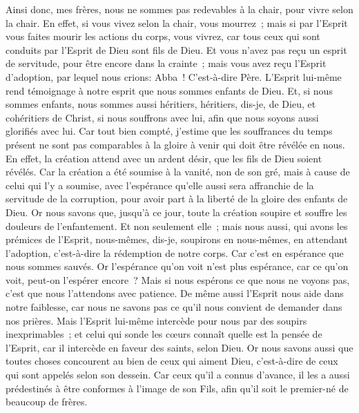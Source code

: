 \begin{multicols}{2}
Ainsi donc, mes frères, nous ne sommes pas redevables à la chair, pour vivre selon la chair.
En effet, si vous vivez selon la chair, vous mourrez~; mais si par l'Esprit vous faites mourir les actions du corps, vous vivrez,
car tous ceux qui sont conduits par l'Esprit de Dieu sont fils de Dieu.
Et vous n'avez pas reçu un esprit de servitude, pour être encore dans la crainte~; mais vous avez reçu l'Esprit d'adoption, par lequel nous crions: Abba~! C'est-à-dire Père.
L'Esprit lui-même rend témoignage à notre esprit que nous sommes enfants de Dieu.
Et, si nous sommes enfants, nous sommes aussi héritiers, héritiers, dis-je, de Dieu, et cohéritiers de Christ, si nous souffrons avec lui, afin que nous soyons aussi glorifiés avec lui.
Car tout bien compté, j'estime que les souffrances du temps présent ne sont pas comparables à la gloire à venir qui doit être révélée en nous.
En effet, la création attend avec un ardent désir, que les fils de Dieu soient révélés.
Car la création a été soumise à la vanité, non de son gré, mais à cause de celui qui l'y a soumise,
avec l'espérance qu'elle aussi sera affranchie de la servitude de la corruption, pour avoir part à la liberté de la gloire des enfants de Dieu.
Or nous savons que, jusqu'à ce jour, toute la création soupire et souffre les douleurs de l'enfantement.
Et non seulement elle~; mais nous aussi, qui avons les prémices de l'Esprit, nous-mêmes, dis-je, soupirons en nous-mêmes, en attendant l'adoption, c'est-à-dire la rédemption de notre corps.
Car c'est en espérance que nous sommes sauvés. Or l'espérance qu'on voit n'est plus espérance, car ce qu'on voit, peut-on l'espérer encore~?
Mais si nous espérons ce que nous ne voyons pas, c'est que nous l'attendons avec patience.
De même aussi l'Esprit nous aide dans notre faiblesse, car nous ne savons pas ce qu'il nous convient de demander dans nos prières. Mais l'Esprit lui-même intercède pour nous par des soupirs inexprimables~;
et celui qui sonde les cœurs connaît quelle est la pensée de l'Esprit, car il intercède en faveur des saints, selon Dieu.
Or nous savons aussi que toutes choses concourent au bien de ceux qui aiment Dieu, c'est-à-dire de ceux qui sont appelés selon son dessein.
Car ceux qu'il a connus d'avance, il les a aussi prédestinés à être conformes à l'image de son Fils, afin qu'il soit le premier-né de beaucoup de frères.

\end{multicols}
